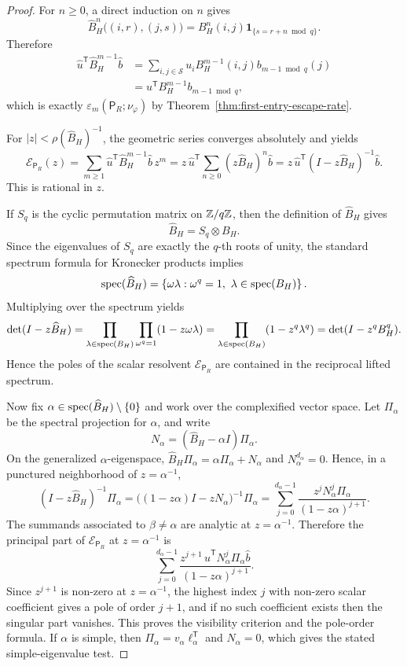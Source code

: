 \begin{proof}
For \(n\geq 0\), a direct induction on \(n\) gives
\[
  \widehat B_H^n\bigl((i,r),(j,s)\bigr)
  = B_H^n(i,j)\mathbf{1}_{\{s=r+n\bmod q\}}.
\]
Therefore
\begin{align*}
  \widehat u^{\mathsf T}\widehat B_H^{m-1}\widehat b
  &= \sum_{i,j\in\mathcal S}
      u_i B_H^{m-1}(i,j)b_{m-1\bmod q}(j) \\
  &= u^{\mathsf T}B_H^{m-1}b_{m-1\bmod q},
\end{align*}
which is exactly
\(\varepsilon_m(\mathsf{P}_R;\nu_\varphi)\) by
Theorem~\ref{thm:first-entry-escape-rate}.

For \(|z|<\rho(\widehat B_H)^{-1}\), the geometric series converges
absolutely and yields
\[
  \mathcal E_{\mathsf{P}_R}(z)
  = \sum_{m\geq 1}
      \widehat u^{\mathsf T}\widehat B_H^{m-1}\widehat b\,z^m
  = z\,\widehat u^{\mathsf T}
      \sum_{n\geq 0}(z\widehat B_H)^n\widehat b
  = z\,\widehat u^{\mathsf T}
      (I-z\widehat B_H)^{-1}\widehat b.
\]
This is rational in \(z\).

If \(S_q\) is the cyclic permutation matrix on \(\mathbb{Z}/q\mathbb{Z}\), then the
definition of \(\widehat B_H\) gives
\[
  \widehat B_H=S_q\otimes B_H.
\]
Since the eigenvalues of \(S_q\) are exactly the \(q\)-th roots of
unity, the standard spectrum formula for Kronecker products implies
\[
  \operatorname{spec}(\widehat B_H)
  = \left\{\omega\lambda:
         \omega^q=1,\ \lambda\in\operatorname{spec}(B_H)\right\}.
\]
Multiplying over the spectrum yields
\[
  \det(I-z\widehat B_H)
  = \prod_{\lambda\in\operatorname{spec}(B_H)}
      \prod_{\omega^q=1}(1-z\omega\lambda)
  = \prod_{\lambda\in\operatorname{spec}(B_H)}(1-z^q\lambda^q)
  = \det(I-z^q B_H^q).
\]
Hence the poles of the scalar resolvent
\(\mathcal E_{\mathsf{P}_R}\) are contained in the reciprocal lifted
spectrum.

Now fix \(\alpha\in\operatorname{spec}(\widehat B_H)\setminus\{0\}\) and work over the
complexified vector space.  Let \(\Pi_\alpha\) be the spectral projection
for \(\alpha\), and write
\[
  N_\alpha=(\widehat B_H-\alpha I)\Pi_\alpha .
\]
On the generalized \(\alpha\)-eigenspace,
\(\widehat B_H\Pi_\alpha=\alpha\Pi_\alpha+N_\alpha\) and
\(N_\alpha^{d_\alpha}=0\).  Hence, in a punctured neighborhood of
\(z=\alpha^{-1}\),
\[
  (I-z\widehat B_H)^{-1}\Pi_\alpha
  =\bigl((1-z\alpha)I-zN_\alpha\bigr)^{-1}\Pi_\alpha
  =\sum_{j=0}^{d_\alpha-1}
     \frac{z^jN_\alpha^j\Pi_\alpha}{(1-z\alpha)^{j+1}}.
\]
The summands associated to \(\beta\neq\alpha\) are analytic at
\(z=\alpha^{-1}\).  Therefore the principal part of
\(\mathcal E_{\mathsf{P}_R}\) at \(z=\alpha^{-1}\) is
\[
  \sum_{j=0}^{d_\alpha-1}
  \frac{z^{j+1}\,
        \widehat u^{\mathsf T}N_\alpha^j\Pi_\alpha\widehat b}
       {(1-z\alpha)^{j+1}}.
\]
Since \(z^{j+1}\) is non-zero at \(z=\alpha^{-1}\), the highest index
\(j\) with non-zero scalar coefficient gives a pole of order \(j+1\),
and if no such coefficient exists then the singular part vanishes.  This
proves the visibility criterion and the pole-order formula.  If
\(\alpha\) is simple, then
\(\Pi_\alpha=v_\alpha\ell_\alpha^{\mathsf T}\) and
\(N_\alpha=0\), which gives the stated simple-eigenvalue test.


\end{proof}
